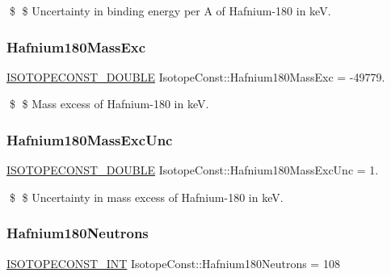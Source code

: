 \$ \$ Uncertainty in binding energy per A of Hafnium-\/180 in keV. \mbox{\label{group___isotope_const-_hafnium-_hf180_ga44e7ee1cf5d13b74932479aa06091161}} 
\subsubsection{\texorpdfstring{Hafnium180\+Mass\+Exc}{Hafnium180MassExc}}
{\footnotesize\ttfamily \mbox{\hyperlink{group___isotope_const-_macros_ga8f45a7272ce02c0b4c65c44636ed719a}{I\+S\+O\+T\+O\+P\+E\+C\+O\+N\+S\+T\+\_\+\+D\+O\+U\+B\+LE}} Isotope\+Const\+::\+Hafnium180\+Mass\+Exc = -\/49779.}

\$ \$ Mass excess of Hafnium-\/180 in keV. \mbox{\label{group___isotope_const-_hafnium-_hf180_ga2f2ab5b9730d5cc12aef4d0c63c690c4}} 
\subsubsection{\texorpdfstring{Hafnium180\+Mass\+Exc\+Unc}{Hafnium180MassExcUnc}}
{\footnotesize\ttfamily \mbox{\hyperlink{group___isotope_const-_macros_ga8f45a7272ce02c0b4c65c44636ed719a}{I\+S\+O\+T\+O\+P\+E\+C\+O\+N\+S\+T\+\_\+\+D\+O\+U\+B\+LE}} Isotope\+Const\+::\+Hafnium180\+Mass\+Exc\+Unc = 1.}

\$ \$ Uncertainty in mass excess of Hafnium-\/180 in keV. \mbox{\label{group___isotope_const-_hafnium-_hf180_ga8528303f3d87fa0a5ccc6e43c4bfbafa}} 
\subsubsection{\texorpdfstring{Hafnium180\+Neutrons}{Hafnium180Neutrons}}
{\footnotesize\ttfamily \mbox{\hyperlink{group___isotope_const-_macros_ga5f18360b3e99483a35c32d789e62621c}{I\+S\+O\+T\+O\+P\+E\+C\+O\+N\+S\+T\+\_\+\+I\+NT}} Isotope\+Const\+::\+Hafnium180\+Neutrons = 108}


